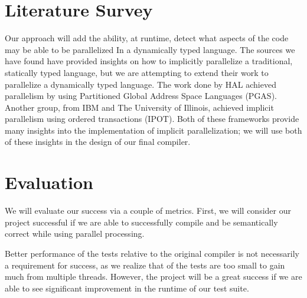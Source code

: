 \documentclass{article}
\begin{document}
\begin{multicols}{2}
\section{Literature Survey}

Our approach will add the ability, at runtime, detect what aspects of the code may be able to be parallelized In a dynamically typed language. The sources we have found have provided insights on how to implicitly parallelize a traditional, statically typed language, but we are attempting to extend their work to parallelize a dynamically typed language. The work done by HAL achieved parallelism by using
Partitioned Global Address Space Languages (PGAS). Another group, from IBM and The University of Illinois, achieved implicit parallelism
using ordered transactions (IPOT). Both of these frameworks provide many insights into the implementation of implicit parallelization; we
will use both of these insights in the design of our final compiler.

\section{Evaluation}

We will evaluate our success via a couple of metrics. First, we will consider our project successful
if we are able to successfully compile and be semantically correct while using parallel processing.

Better performance of the tests relative to the original compiler is not necessarily a requirement for
success, as we realize that of the tests are too small to gain much from multiple threads. However,
the project will be a great success if we are able to see significant improvement in the runtime
of our test suite.




\vspace{\textheight}
\end{multicols}
\end{document}
